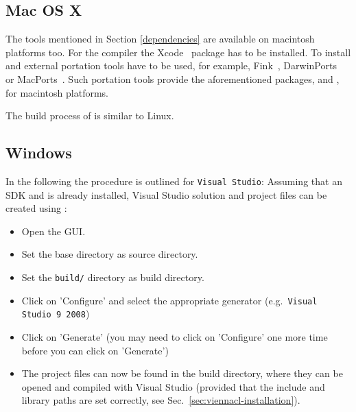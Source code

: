 
\subsection{Mac OS X}
\label{apple}
The tools mentioned in Section \ref{dependencies} are available on 
macintosh platforms too. 
For the {\GCC} compiler the Xcode~\cite{xcode} package has to be installed.
To install {\CMake} and {\Boost} external portation tools have to be used, 
for example, Fink~\cite{fink}, DarwinPorts~\cite{darwinports} 
or MacPorts~\cite{macports}. Such portation tools provide the 
aforementioned packages, {\CMake} and {\Boost}, for macintosh platforms. 


The build process of {\ViennaCL} is similar to Linux.

\subsection{Windows}
In the following the procedure is outlined for \texttt{Visual Studio}: Assuming that an {\OpenCL} SDK and {\CMake} is already installed, Visual Studio solution and project files can be created using {\CMake}:
\begin{itemize}
\item Open the {\CMake} GUI.
\item Set the {\ViennaCL} base directory as source directory.
\item Set the \texttt{build/} directory as build directory.
\item Click on 'Configure' and select the appropriate generator (e.g.~\texttt{Visual Studio 9 2008})
\item Click on 'Generate' (you may need to click on 'Configure' one more time before you can click on 'Generate')
\item The project files can now be found in the {\ViennaCL} build directory, where they can be opened and compiled with Visual Studio (provided that the include and library paths are set correctly, see Sec.~\ref{sec:viennacl-installation}).
\end{itemize}



























